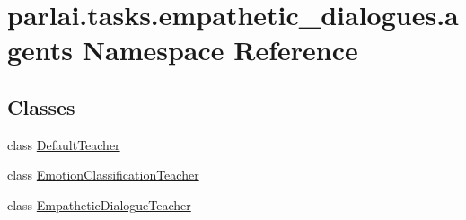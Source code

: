 \hypertarget{namespaceparlai_1_1tasks_1_1empathetic__dialogues_1_1agents}{}\section{parlai.\+tasks.\+empathetic\+\_\+dialogues.\+agents Namespace Reference}
\label{namespaceparlai_1_1tasks_1_1empathetic__dialogues_1_1agents}
\subsection*{Classes}
\begin{DoxyCompactItemize}
\item 
class \hyperlink{classparlai_1_1tasks_1_1empathetic__dialogues_1_1agents_1_1DefaultTeacher}{Default\+Teacher}
\item 
class \hyperlink{classparlai_1_1tasks_1_1empathetic__dialogues_1_1agents_1_1EmotionClassificationTeacher}{Emotion\+Classification\+Teacher}
\item 
class \hyperlink{classparlai_1_1tasks_1_1empathetic__dialogues_1_1agents_1_1EmpatheticDialogueTeacher}{Empathetic\+Dialogue\+Teacher}
\end{DoxyCompactItemize}
